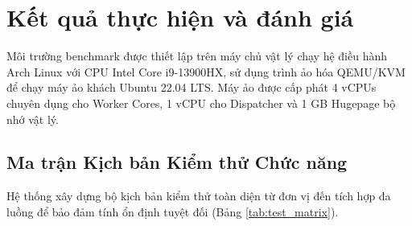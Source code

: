 \documentclass[12pt,a4paper,twoside]{report}
\begin{document}
\newpage
\chapter{Kết quả thực hiện và đánh giá}

Môi trường benchmark được thiết lập trên máy chủ vật lý chạy hệ điều hành Arch Linux với CPU Intel Core i9-13900HX, sử dụng trình ảo hóa QEMU/KVM để chạy máy ảo khách Ubuntu 22.04 LTS. Máy ảo được cấp phát 4 vCPUs chuyên dụng cho Worker Cores, 1 vCPU cho Dispatcher và 1 GB Hugepage bộ nhớ vật lý.

\section{Ma trận Kịch bản Kiểm thử Chức năng}
Hệ thống xây dựng bộ kịch bản kiểm thử toàn diện từ đơn vị đến tích hợp đa luồng để bảo đảm tính ổn định tuyệt đối (Bảng \ref{tab:test_matrix}).
\end{document}
